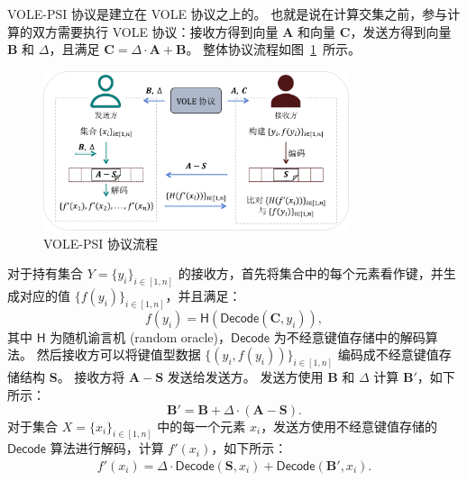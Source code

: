 VOLE-PSI 协议是建立在 VOLE 协议之上的。
也就是说在计算交集之前，参与计算的双方需要执行 VOLE 协议：接收方得到向量 $\mathbf{A}$ 和向量 $\mathbf{C}$，发送方得到向量 $\mathbf{B}$ 和 $\Delta$，且满足 $\mathbf{C} = \Delta \cdot \mathbf{A} + \mathbf{B}$。
整体协议流程如图~\ref{fig:psi_okvs}~所示。
\begin{figure}[ht]
  \centering
  \includegraphics[width=0.8\textwidth]{figures/psi_okvs.pdf}
  \caption{VOLE-PSI 协议流程}
  \label{fig:psi_okvs}
\end{figure}
对于持有集合 $Y=\{y_i\}_{i\in [1,n]}$ 的接收方，首先将集合中的每个元素看作键，并生成对应的值 $\{f(y_i)\}_{i\in [1,n]}$，并且满足：
\begin{equation}
  f(y_i) = \mathsf{H}(\mathsf{Decode}(\mathbf{C}, y_i)),
\end{equation}
其中 $\mathsf{H}$ 为随机谕言机 (random oracle)，$\mathsf{Decode}$ 为不经意键值存储中的解码算法。
然后接收方可以将键值型数据 $\{(y_i, f(y_i))\}_{i\in [1,n]}$ 编码成不经意键值存储结构 $\mathbf{S}$。
接收方将 $\mathbf{A} - \mathbf{S}$ 发送给发送方。
发送方使用 $\mathbf{B}$ 和 $\Delta$ 计算 $\mathbf{B}'$，如下所示：
\begin{equation}
  \mathbf{B}' = \mathbf{B} + \Delta\cdot (\mathbf{A} - \mathbf{S}).
\end{equation}
对于集合 $X=\{x_i\}_{i\in [1,n]}$ 中的每一个元素 $x_i$，发送方使用不经意键值存储的 $\mathsf{Decode}$ 算法进行解码，计算 $f'(x_i)$，如下所示：
\begin{align}
  f'(x_i) = \Delta \cdot \mathsf{Decode}(\mathbf{S}, x_i) + \mathsf{Decode}(\mathbf{B'}, x_i).
\end{align}
